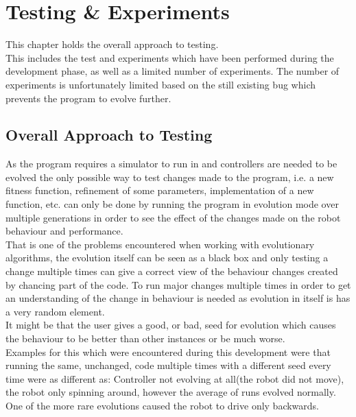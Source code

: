 \chapter{Testing \& Experiments}
This chapter holds the overall approach to testing. \\
This includes the test and experiments which have been performed during the development phase, as well as a limited number of experiments. 
The number of experiments is unfortunately limited based on the still existing bug which prevents the program to evolve further. \\

\section{Overall Approach to Testing}
As the program requires a simulator to run in and controllers are needed to be evolved the only possible way to test changes made to the program, i.e. a new fitness function, refinement of some parameters, implementation of a new function, etc. can only be done by running the program in evolution mode over multiple generations in order to see the effect of the changes made on the robot behaviour and performance.\\
That is one of the problems encountered when working with evolutionary algorithms, the evolution itself can be seen as a black box and only testing a change multiple times can give a correct view of the behaviour changes created by chancing part of the code. To run major changes multiple times in order to get an understanding of the change in behaviour is needed as evolution in itself is has a very random element.\\
It might be that the user gives a good, or bad, seed for evolution which causes the behaviour to be better than other instances or be much worse. \\
Examples for this which were encountered during this development were that running the same, unchanged, code multiple times with a different seed every time were as different as: Controller not evolving at all(the robot did not move), the robot only spinning around, however the average of runs evolved normally. \\
One of the more rare evolutions caused the robot to drive only backwards. \\

